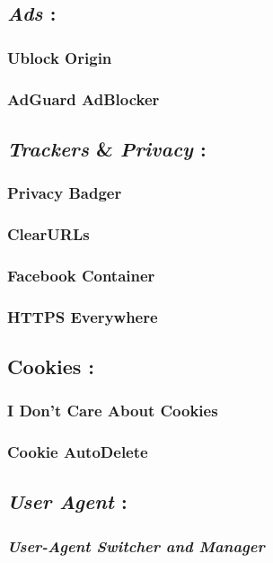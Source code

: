 \documentclass[12pt, a4paper]{article}
\begin{document}
\subsection*{\emph{Ads} :}
\subsubsection*{Ublock Origin}
\subsubsection*{AdGuard AdBlocker\\}

\subsection*{\emph{Trackers} \& \emph{Privacy} :}
\subsubsection*{Privacy Badger}
\subsubsection*{ClearURLs}
\subsubsection*{Facebook Container}
\subsubsection*{HTTPS Everywhere\\}

\subsection*{Cookies :}
\subsubsection*{I Don't Care About Cookies}
\subsubsection*{Cookie AutoDelete\\}

\subsection*{\emph{User Agent} :}
\subsubsection*{\emph{User-Agent Switcher and Manager}}
\end{document}
